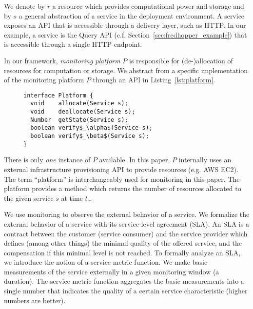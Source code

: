 We denote by $r$ a resource which provides computational power and storage
and by $s$ a general abstraction of a service in the deployment environment. 
A service exposes an API that is accessible through a delivery layer, such as HTTP.
In our example, a service is the Query API (c.f. Section~\ref{sec:fredhopper_example}) that is accessible through a single HTTP endpoint.

In our framework, 
\emph{monitoring platform}  $P$ is responsible for (de-)allocation of resources for computation or storage.
We abstract from a specific implementation of the monitoring platform $P$ through an API in Listing~\ref{lst:platform}. 
% 

\lstset{language=java,aboveskip=-20pt,belowskip=-20pt}
\begin{figure}[h]
\begin{center}
\begin{lstlisting}[mathescape,caption=Platform API,label=lst:platform]
interface Platform {
  void    allocate(Service s);
  void    deallocate(Service s);
  Number  getState(Service s);
  boolean verify$_\alpha$(Service s);
  boolean verify$_\beta$(Service s);
}
\end{lstlisting}
\end{center}   
\end{figure}
\lstset{mathescape=false}
% 

There is only \emph{one} instance of $P$ available.
In this paper, $P$ internally uses an external infrastructure provisioning API to provide resources (e.g. AWS EC2).
The term ``platform'' is interchangeably used for monitoring in this paper.
The platform provides a method  which returns
the number of resources allocated to the given service $s$ at time $t_c$.

We use monitoring to observe the external behavior of a service.
We formalize the external behavior of a service with its service-level agreement (SLA).
An SLA is a contract between the customer (service consumer) and the service provider
which defines (among other things) the minimal quality of the offered service,
and the compensation if this minimal level is not reached.
To formally analyze an SLA, we introduce the notion of a service metric function.
We make basic measurements of the service externally in a given monitoring window (a duration).
The service metric function aggregates the basic measurements into a single number
that indicates the quality of a certain service characteristic (higher numbers are better).
%

